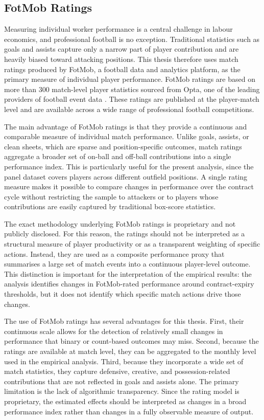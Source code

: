 \documentclass{article}
\begin{document}
\subsection{FotMob Ratings}

Measuring individual worker performance is a central challenge in labour economics, and professional football is no exception. Traditional statistics such as goals and assists capture only a narrow part of player contribution and are heavily biased toward attacking positions. This thesis therefore uses match ratings produced by FotMob, a football data and analytics platform, as the primary measure of individual player performance. FotMob ratings are based on more than 300 match-level player statistics sourced from Opta, one of the leading providers of football event data \citep{fotmob_faq, statsperform_opta}. These ratings are published at the player-match level and are available across a wide range of professional football competitions.

The main advantage of FotMob ratings is that they provide a continuous and comparable measure of individual match performance. Unlike goals, assists, or clean sheets, which are sparse and position-specific outcomes, match ratings aggregate a broader set of on-ball and off-ball contributions into a single performance index. This is particularly useful for the present analysis, since the panel dataset covers players across different outfield positions. A single rating measure makes it possible to compare changes in performance over the contract cycle without restricting the sample to attackers or to players whose contributions are easily captured by traditional box-score statistics.

The exact methodology underlying FotMob ratings is proprietary and not publicly disclosed. For this reason, the ratings should not be interpreted as a structural measure of player productivity or as a transparent weighting of specific actions. Instead, they are used as a composite performance proxy that summarises a large set of match events into a continuous player-level outcome. This distinction is important for the interpretation of the empirical results: the analysis identifies changes in FotMob-rated performance around contract-expiry thresholds, but it does not identify which specific match actions drive those changes.

The use of FotMob ratings has several advantages for this thesis. First, their continuous scale allows for the detection of relatively small changes in performance that binary or count-based outcomes may miss. Second, because the ratings are available at match level, they can be aggregated to the monthly level used in the empirical analysis. Third, because they incorporate a wide set of match statistics, they capture defensive, creative, and possession-related contributions that are not reflected in goals and assists alone. The primary limitation is the lack of algorithmic transparency. Since the rating model is proprietary, the estimated effects should be interpreted as changes in a broad performance index rather than changes in a fully observable measure of output.






\end{document}
